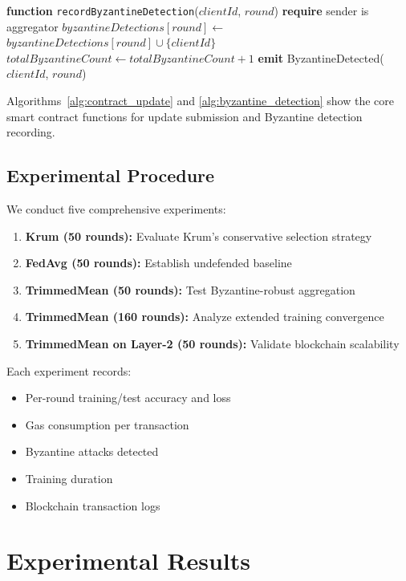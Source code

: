 \documentclass[12pt,a4paper,onecolumn]{article}
\begin{document}
\begin{algorithm}[t]
\caption{Byzantine Detection and Recording}
\label{alg:byzantine_detection}
\begin{algorithmic}[1]
\STATE \textbf{function} \texttt{recordByzantineDetection}($clientId$, $round$)
\STATE \textbf{require} sender is aggregator
\STATE $byzantineDetections[round] \gets$ $byzantineDetections[round] \cup \{clientId\}$
\STATE $totalByzantineCount \gets totalByzantineCount + 1$
\STATE \textbf{emit} ByzantineDetected($clientId$, $round$)
\end{algorithmic}
\end{algorithm}

Algorithms~\ref{alg:contract_update} and \ref{alg:byzantine_detection} show the core smart contract functions for update submission and Byzantine detection recording.

\subsection{Experimental Procedure}

We conduct five comprehensive experiments:

\begin{enumerate}
    \item \textbf{Krum (50 rounds):} Evaluate Krum's conservative selection strategy
    \item \textbf{FedAvg (50 rounds):} Establish undefended baseline
    \item \textbf{TrimmedMean (50 rounds):} Test Byzantine-robust aggregation
    \item \textbf{TrimmedMean (160 rounds):} Analyze extended training convergence
    \item \textbf{TrimmedMean on Layer-2 (50 rounds):} Validate blockchain scalability
\end{enumerate}

Each experiment records:
\begin{itemize}
    \item Per-round training/test accuracy and loss
    \item Gas consumption per transaction
    \item Byzantine attacks detected
    \item Training duration
    \item Blockchain transaction logs
\end{itemize}

\section{Experimental Results}
\label{sec:results}
\end{document}
